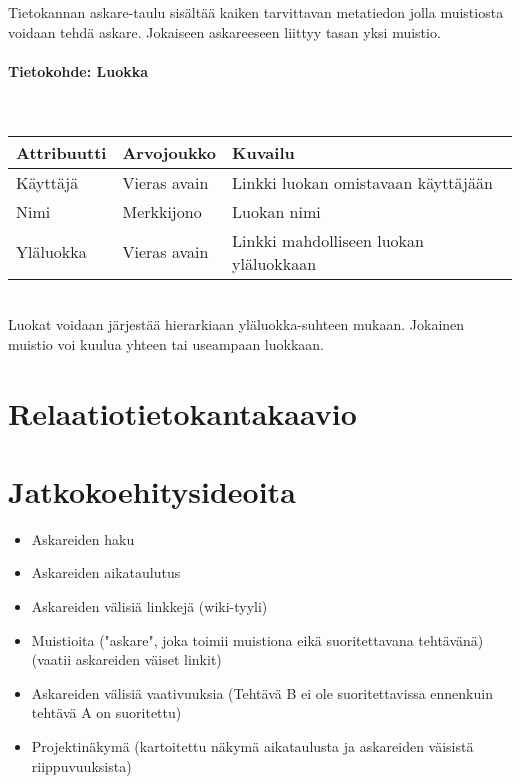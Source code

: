 ﻿\documentclass[finnish]{article}
\begin{document}
\vspace{5pt}
Tietokannan askare-taulu sisältää kaiken tarvittavan metatiedon jolla muistiosta voidaan tehdä askare.
Jokaiseen askareeseen liittyy tasan yksi muistio.


\paragraph{Tietokohde: Luokka} ~\\

\begin{tabular}{ | l | l | l | }
  \hline
  Attribuutti & Arvojoukko & Kuvailu \\ \hline
  Käyttäjä & Vieras avain & Linkki luokan omistavaan käyttäjään \\
  Nimi & Merkkijono & Luokan nimi \\
  Yläluokka & Vieras avain & Linkki mahdolliseen luokan yläluokkaan \\
  \hline
\end{tabular} \\

\vspace{5pt}
Luokat voidaan järjestää hierarkiaan yläluokka-suhteen mukaan. Jokainen muistio voi kuulua yhteen tai useampaan luokkaan.


\section{Relaatiotietokantakaavio}


\section{Jatkokoehitysideoita}

\begin{itemize}
  \item Askareiden haku
  \item Askareiden aikataulutus
  \item Askareiden välisiä linkkejä (wiki-tyyli)
  \item Muistioita ("askare", joka toimii muistiona eikä suoritettavana tehtävänä) (vaatii askareiden väiset linkit)
  \item Askareiden välisiä vaativuuksia (Tehtävä B ei ole suoritettavissa ennenkuin tehtävä A on suoritettu)
  \item Projektinäkymä (kartoitettu näkymä aikataulusta ja askareiden väisistä riippuvuuksista)
\end{itemize}
\end{document}
